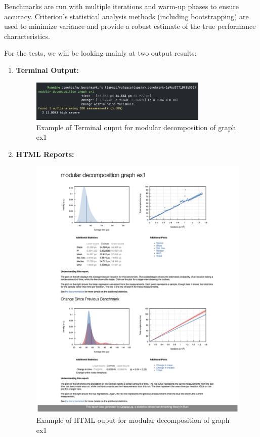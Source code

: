 Benchmarks are run with multiple iterations and warm-up phases to ensure accuracy.
Criterion’s statistical analysis methods (including bootstrapping) are used to minimize variance and provide a robust estimate of the true performance characteristics.

\begin{myex}
    For the tests, we will be looking mainly at two output results:
    \begin{enumerate}
        \item \textbf{Terminal Output:}
                \begin{figure}[!h]
                    \centering
                    \includegraphics[width=0.80\textwidth]{images/benchmark/benchmark-terminal-output}
                    \caption{Example of Terminal ouput for modular decomposition of graph ex1}
                    \label{fig:example-of-terminal-output}
                \end{figure}
        \item \textbf{HTML Reports:}
                \begin{figure}[!h]
                    \centering
                    \includegraphics[width=1\textwidth]{images/benchmark/benchmark-html-output}
                    \caption{Example of HTML ouput for modular decomposition of graph ex1}
                    \label{fig:example-of-html-output}
                \end{figure}
    \end{enumerate}
\end{myex}
